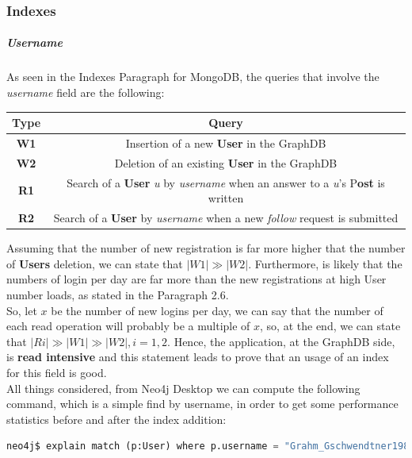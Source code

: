 \subsubsection{Indexes}
\subparagraph{Username} As seen in the Indexes Paragraph for MongoDB, the queries that involve the \textit{username} field are the following:
\begin{center}
	\begin{tabular}{|c | c |} 
		\hline
		\textbf{Type} & \textbf{Query} \\ [0.5ex] 
		\hline
		\textbf{W1} & Insertion of a new \textbf{User} in the GraphDB\\ 
		\hline
		\textbf{W2} & Deletion of an existing \textbf{User} in the GraphDB \\
		\hline
		\textbf{R1} & Search of a \textbf{User} \textit{u} by \textit{username} when an answer to a \textit{u}'s P\textbf{ost} is written \\
		\hline
		\textbf{R2} & Search of a \textbf{User} by \textit{username} when a new \textit{follow} request is submitted \\
		\hline
	\end{tabular}
\end{center}
Assuming that the number of new registration is far more higher that the number of \textbf{Users} deletion, we can state that $|W1| \gg |W2|$. Furthermore, is likely that the numbers of login per day are far more than the new registrations at high User number loads, as stated in the Paragraph 2.6.\\
So, let $x$ be the number of new logins per day, we can say that the number of each read operation will probably be a multiple of $x$, so, at the end, we can state that $|Ri| \gg |W1| \gg |W2|, i = 1,2$. Hence, the application, at the GraphDB side, is \textbf{read intensive} and this statement leads to prove that an usage of an index for this field is good.\\
All things considered, from Neo4j Desktop we can compute the following command, which is a simple find by username, in order to get some performance statistics before and after the index addition:
\begin{lstlisting}[language=python]
	neo4j$ explain match (p:User) where p.username = "Grahm_Gschwendtner1989" return p
\end{lstlisting}

